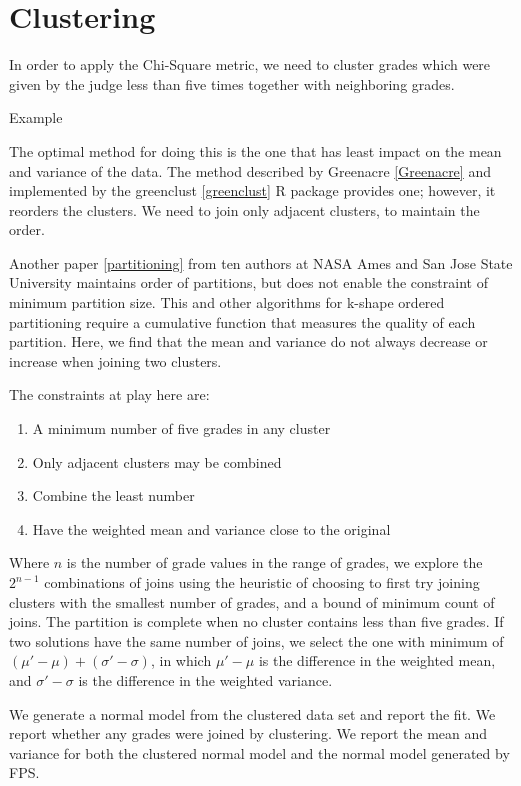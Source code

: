 \section{Clustering}

In order to apply the Chi-Square metric, we need to cluster grades which
were given by the judge less than five times together with neighboring
grades.

Example

The optimal method for doing this is the one that has least impact on
the mean and variance of the data. The method described by
Greenacre \ref{Greenacre}
and implemented by the
greenclust \ref{greenclust}
R package provides one; however, it reorders the clusters.
We need to join only adjacent clusters, to maintain the order.

Another paper
\ref {partitioning}
from ten authors at NASA Ames and San Jose State University
maintains order of partitions, but does not enable the constraint of
minimum partition size. This and other algorithms for k-shape
ordered partitioning require a cumulative
function that measures the quality of each partition.
Here, we find that the mean and variance do not always decrease or
increase when joining two clusters.

The constraints at play here are:
\begin{enumerate}
\item{A minimum number of five grades in any cluster}
\item{Only adjacent clusters may be combined}
\item{Combine the least number}
\item{Have the weighted mean and variance close to the original}
\end{enumerate}

Where $n$ is the number of grade values in the range of grades,
we explore the $2^{n-1}$ combinations of joins using the heuristic
of choosing to first try joining clusters with the smallest number of grades,
and a bound of minimum count of joins. The partition
is complete when no cluster contains less than five grades. If two solutions
have the same number of joins, we select the one with minimum of
$(\mu' - \mu) + (\sigma' - \sigma)$, in which
$\mu' - \mu$ is
the difference in the weighted mean, and
$\sigma' - \sigma$ is
the difference in the weighted variance.

We generate a normal model from the clustered data set and report
the fit.
We report whether any grades were joined by clustering.
We report the mean and variance for both the clustered normal model
and the normal model generated by FPS.
